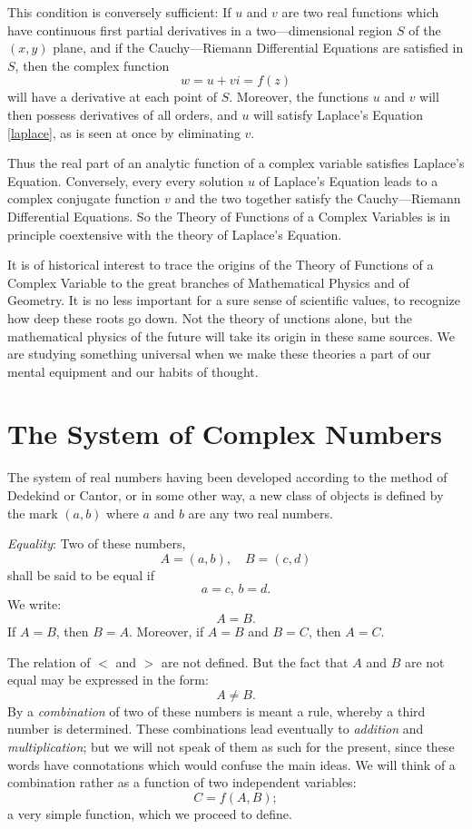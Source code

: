 This condition is conversely sufficient: If $u$ and $v$ are two real functions which have continuous first partial derivatives in a two---dimensional region $S$ of the $(x,y)$ plane, and if the Cauchy---Riemann Differential Equations are satisfied in $S$, then the complex function
\[
	w=u+vi=f(z)
\] will have a derivative at each point of $S$. Moreover, the functions $u$ and $v$ will then possess derivatives of all orders, and $u$ will satisfy Laplace's Equation \ref{laplace}, as is seen at once by eliminating $v$. 

Thus the real part of an analytic function of a complex variable satisfies Laplace's Equation. Conversely, every every solution $u$ of Laplace's Equation leads to a complex conjugate function $v$ and the two together satisfy the Cauchy---Riemann Differential Equations. So the Theory of Functions of a Complex Variables is in principle coextensive with the theory of Laplace's Equation. 

It is of historical interest to trace the origins of the Theory of Functions of a Complex Variable to the great branches of Mathematical Physics and of Geometry. It is no less important for a sure sense of scientific values, to recognize how deep these roots go down. Not the theory of unctions alone, but the mathematical physics of the future will take its origin in these same sources. We are studying something universal when we make these theories a part of our mental equipment and our habits of thought. 

\section{The System of Complex Numbers}

The system of real numbers having been developed according to the method of Dedekind or Cantor, or in some other way, a new class of objects is defined by the mark $(a,b)$ where $a$ and $b$ are any two real numbers. 

\emph{Equality}: Two of these numbers,
\[
	A=(a,b), \quad B=(c,d)
\] shall be said to be equal if
\[
a=c, \, b=d
.\] We write:
\[
A=B
.\] If $A=B$, then $B=A$. Moreover, if $A=B$ and $B=C$, then $A=C$.

The relation of $<$ and $>$ are not defined. But the fact that $A$ and $B$ are not equal may be expressed in the form:
\[
A\neq B
.\] By a \emph{combination} of two of these numbers is meant a rule, whereby a third number is determined. These combinations lead eventually to \emph{addition} and \emph{multiplication}; but we will not speak of them as such for the present, since these words have connotations which would confuse the main ideas. We will think of a combination rather as a function of two independent variables:
\[
	C=f(A,B)
;\] a very simple function, which we proceed to define. 

